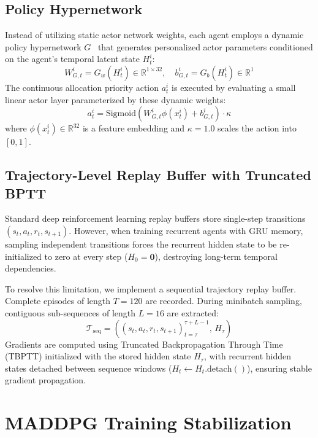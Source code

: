 \documentclass[journal]{IEEEtran}
\begin{document}
\subsection{Policy Hypernetwork}
Instead of utilizing static actor network weights, each agent employs a dynamic policy hypernetwork $G$~\cite{ha2017hypernetworks} that generates personalized actor parameters conditioned on the agent's temporal latent state $H_t^i$:
\begin{equation}
W_{G,t}^i = G_w(H_t^i) \in \mathbb{R}^{1 \times 32}, \quad b_{G,t}^i = G_b(H_t^i) \in \mathbb{R}^1
\label{eq:hypernetwork}
\end{equation}
The continuous allocation priority action $a_t^i$ is executed by evaluating a small linear actor layer parameterized by these dynamic weights:
\begin{equation}
a_t^i = \text{Sigmoid}\left(W_{G,t}^i \phi(x_t^i) + b_{G,t}^i\right) \cdot \kappa
\label{eq:actor_action}
\end{equation}
where $\phi(x_t^i) \in \mathbb{R}^{32}$ is a feature embedding and $\kappa = 1.0$ scales the action into $[0, 1]$.

\subsection{Trajectory-Level Replay Buffer with Truncated BPTT}
Standard deep reinforcement learning replay buffers store single-step transitions $(s_t, a_t, r_t, s_{t+1})$. However, when training recurrent agents with GRU memory, sampling independent transitions forces the recurrent hidden state to be re-initialized to zero at every step ($H_0 = \mathbf{0}$), destroying long-term temporal dependencies.

To resolve this limitation, we implement a sequential trajectory replay buffer. Complete episodes of length $T=120$ are recorded. During minibatch sampling, contiguous sub-sequences of length $L=16$ are extracted:
\begin{equation}
\mathcal{T}_{\text{seq}} = \left( (s_t, a_t, r_t, s_{t+1})_{t=\tau}^{\tau+L-1}, \, H_{\tau} \right)
\end{equation}
Gradients are computed using Truncated Backpropagation Through Time (TBPTT) initialized with the stored hidden state $H_{\tau}$, with recurrent hidden states detached between sequence windows ($H_{t} \leftarrow H_t.\text{detach}()$), ensuring stable gradient propagation.

\section{MADDPG Training Stabilization}
\label{sec:stabilization}
\end{document}
